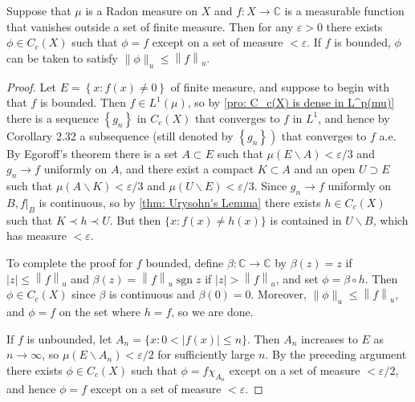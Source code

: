 \documentclass[12pt, a4paper, oneside]{book}
\begin{document}
\begin{theorem}
    \label{pro: Lusin's Theorem}
    Suppose that $\mu$ is a Radon measure on $X$ and $f: X \rightarrow \mathbb{C}$ is a measurable function that vanishes outside a set of finite measure. Then for any $\varepsilon>0$ there exists $\phi \in C_c(X)$ such that $\phi=f$ except on a set of measure $<\varepsilon$. If $f$ is bounded, $\phi$ can be taken to satisfy $\|\phi\|_u \leq\left\| f \right\|_u$.
    \begin{proof}
        Let $E=\left\{x: f(x) \neq 0\right\}$ of finite measure, and suppose to begin with that $f$ is bounded. Then $f \in L^1(\mu)$, so by \ref{pro: C_c(X) is dense in L^p(mu)} there is a sequence $\left\{g_n\right\}$ in $C_c(X)$ that converges to $f$ in $L^1$, and hence by Corollary 2.32 a subsequence (still denoted by $\left.\left\{g_n\right\}\right)$ that converges to $f$ a.e. By Egoroff's theorem there is a set $A \subset E$ such that $\mu(E \backslash A)<\varepsilon / 3$ and $g_n \rightarrow f$ uniformly on $A$, and there exist a compact $K \subset A$ and
        an open $U \supset E$ such that $\mu(A \backslash K)<\varepsilon / 3$ and $\mu(U \backslash E)<\varepsilon / 3$.
        Since $g_n \rightarrow f$ uniformly on $B, \left.f\right|_B$ is continuous, so by \ref{thm: Urysohn's Lemma} there exists $h \in C_c(X)$ such that $K\prec h \prec U$. But then $\{x: f(x) \neq h(x)\}$ is contained in $U \backslash B$, which has measure $<\varepsilon$.

        To complete the proof for $f$ bounded, define $\beta: \mathbb{C} \rightarrow \mathbb{C}$ by $\beta(z)=z$ if $|z| \leq\left\| f \right\|_u$ and $\beta(z)=\left\| f \right\|_u \operatorname{sgn} z$ if $|z|>\left\| f \right\|_u$, and set $\phi=\beta \circ h$. Then $\phi \in C_c(X)$ since $\beta$ is continuous and $\beta(0)=0$. Moreover, $\|\phi\|_u \leq\left\| f \right\|_u$, and $\phi=f$ on the set where $h=f$, so we are done.

        If $f$ is unbounded, let $A_n=\{x: 0<|f(x)| \leq n\}$. Then $A_n$ increases to $E$ as $n \rightarrow \infty$, so $\mu\left(E \backslash A_n\right)<\varepsilon / 2$ for sufficiently large $n$. By the preceding argument there exists $\phi \in C_c(X)$ such that $\phi=f \chi_{A_n}$ except on a set of measure $<\varepsilon / 2$, and hence $\phi=f$ except on a set of measure $<\varepsilon$.
    \end{proof}
\end{theorem}
\end{document}
